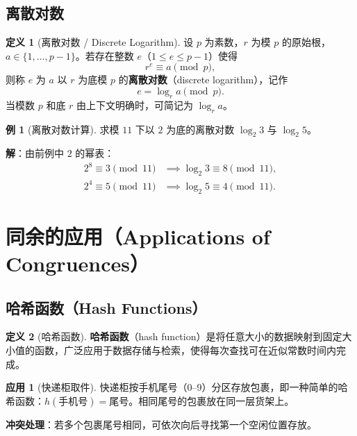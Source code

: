 \documentclass[UTF8,11pt,a4paper]{ctexbook}   %
\theoremstyle{definition}
\newtheorem{definition}{定义}[section]
\newtheorem{example}{例}[section]
\newtheorem{application}{应用}[section]
\begin{document}
\subsection{离散对数}

\begin{definition}[离散对数 / Discrete Logarithm]
设 $p$ 为素数，$r$ 为模 $p$ 的原始根，$a \in \{1,\ldots,p-1\}$。若存在整数 $e$（$1 \le e \le p-1$）使得
\[
r^e \equiv a \pmod{p},
\]
则称 $e$ 为 $a$ 以 $r$ 为底模 $p$ 的\textbf{离散对数}（discrete logarithm），记作
\[
e = \log_r a \pmod{p}.
\]
当模数 $p$ 和底 $r$ 由上下文明确时，可简记为 $\log_r a$。
\end{definition}

\begin{example}[离散对数计算]
求模 $11$ 下以 $2$ 为底的离散对数 $\log_2 3$ 与 $\log_2 5$。

\textbf{解}：由前例中 $2$ 的幂表：
\begin{align*}
2^8 \equiv 3 \pmod{11} &\implies \log_2 3 \equiv 8 \pmod{11},\\
2^4 \equiv 5 \pmod{11} &\implies \log_2 5 \equiv 4 \pmod{11}.
\end{align*}
\end{example}

\section{同余的应用（Applications of Congruences）}

\subsection{哈希函数（Hash Functions）}

\begin{definition}[哈希函数]
\textbf{哈希函数}（hash function）是将任意大小的数据映射到固定大小值的函数，广泛应用于数据存储与检索，使得每次查找可在近似常数时间内完成。
\end{definition}

\begin{application}[快递柜取件]
快递柜按手机尾号（0--9）分区存放包裹，即一种简单的哈希函数：$h(\text{手机号}) = \text{尾号}$。相同尾号的包裹放在同一层货架上。

\textbf{冲突处理}：若多个包裹尾号相同，可依次向后寻找第一个空闲位置存放。
\end{application}
\end{document}
